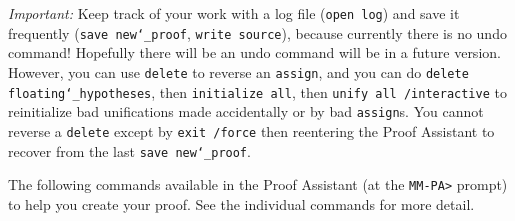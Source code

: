 {\em Important:} Keep track of your work with a log file (\texttt{open
log}) and save it frequently (\texttt{save new{\char`\_}proof},
\texttt{write source}), because currently there is no undo command!
Hopefully there will be an undo command will be in a future version.
However, you can use \texttt{delete} to reverse an \texttt{assign}, and
you can do \texttt{delete floating{\char`\_}hypotheses}, then
\texttt{initialize all}, then \texttt{unify all /interactive} to
reinitialize bad unifications made accidentally or by bad
\texttt{assign}s.  You cannot reverse a \texttt{delete} except by
\texttt{exit /force} then reentering the Proof Assistant to recover from
the last \texttt{save new{\char`\_}proof}.

The following commands available in the Proof Assistant (at the
\texttt{MM-PA>} prompt) to help you create your proof.  See the
individual commands for more detail.

